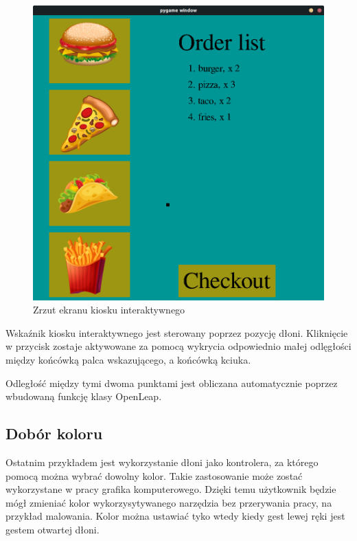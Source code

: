\begin{figure}[H]
    \begin{center}
        \includegraphics[width=15cm]{../images/checkout_window.png}
        \caption{Zrzut ekranu kiosku interaktywnego}
    \end{center}
\end{figure}

\quad Wskaźnik kiosku interaktywnego jest sterowany poprzez pozycję dłoni. Kliknięcie w przycisk zostaje aktywowane za pomocą wykrycia odpowiednio małej odlęgłości między końcówką palca wskazującego, a końcówką kciuka. 

\quad Odległość między tymi dwoma punktami jest obliczana automatycznie poprzez wbudowaną funkcję klasy OpenLeap. 

\subsection{Dobór koloru}
\quad Ostatnim przykładem jest wykorzystanie dłoni jako kontrolera, za którego pomocą można wybrać dowolny kolor. Takie zastosowanie może zostać wykorzystane w pracy grafika komputerowego. Dzięki temu użytkownik będzie mógł zmieniać kolor wykorzysytywanego narzędzia bez przerywania pracy, na przykład malowania. Kolor można ustawiać tyko wtedy kiedy gest lewej ręki jest gestem otwartej dłoni. 


